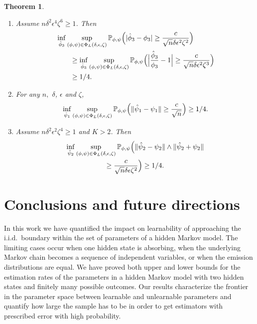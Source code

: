 \documentclass[journal]{IEEEtran}
\newtheorem{theorem}{Theorem}
\newcommand{\1}{\boldsymbol{1}}
\newcommand{\PP}{\mathbb{P}}
\DeclarePairedDelimiter{\brackets}{(}{)}
\DeclarePairedDelimiter{\norm}{\lVert}{\rVert}
\DeclarePairedDelimiter{\abs}{\lvert}{\rvert}
\begin{document}
\begin{theorem}
\begin{enumerate}
                        
			\item\label{item:mlb:phi3} Assume $n\delta^2\epsilon^4\zeta^6\geq 1$. Then
                        \begin{align*}
                          &\inf_{\hat{\phi}_3}  \sup_{(\phi,\psi)\in\Phi_L(\delta,\epsilon, \zeta)}\PP_{\phi,\psi}\brackets[\Big]{\abs{\hat{\phi}_3 - \phi_3}
					\geq  \frac{c}{\sqrt{n}\delta\epsilon^2\zeta^2}} \\
				&\qquad\geq
				\inf_{\hat{\phi}_3}  \sup_{(\phi,\psi)\in\Phi_L(\delta,\epsilon, \zeta)}\PP_{\phi,\psi}\brackets[\Big]{\abs[\Big]{\frac{\hat{\phi}_3}{\phi_3} - 1}
                                  \geq  \frac{c}{\sqrt{n}\delta\epsilon^2\zeta^3}}\\
                          &\qquad\geq 1/4.
                        \end{align*}


                        
			\item\label{item:mlb:psi1} For any $n,$ $\delta$, $\epsilon$ and $\zeta$,
			\[ \inf_{\hat{\psi}_1} \sup_{(\phi,\psi)\in \Phi_L(\delta,\epsilon,\zeta)} \PP_{\phi,\psi}\brackets[\Big]{\norm{\hat{\psi}_1-\psi_1} \geq \frac{c}{\sqrt{n}}}\geq 1/4.\]

                        \item\label{item:mlb:psi2} Assume $n\delta^2\epsilon^2\zeta^4\geq 1$ and  $K>2$. Then
                        \begin{multline*}
                          \inf_{\hat{\psi}_2} \sup_{(\phi,\psi)\in \Phi_L(\delta,\epsilon,\zeta)} \PP_{\phi,\psi}\brackets[\Big]{\norm{\hat{\psi}_2-\psi_2} \wedge \norm{\hat{\psi}_2+\psi_2}\\
                            \geq \frac{c}{\sqrt{n}\delta\epsilon\zeta^2}}\geq 1/4.
                        \end{multline*}
		\end{enumerate}
	\end{theorem}

	\section{Conclusions and future directions}
	\label{sec:conclusion}
	In this work we have quantified the impact on learnability of approaching the i.i.d.\ boundary within the set of parameters of a hidden Markov model. The limiting cases occur when one hidden state is absorbing, when the underlying Markov chain becomes a sequence of independent variables, or when the emission distributions are equal. We have proved both upper and lower bounds for the estimation rates of the parameters in a hidden Markov model with two hidden states and finitely many possible outcomes. Our results characterize the frontier in the parameter space between learnable and unlearnable parameters and quantify how large the sample has to be in order to get estimators with prescribed error with high probability.
\end{document}
